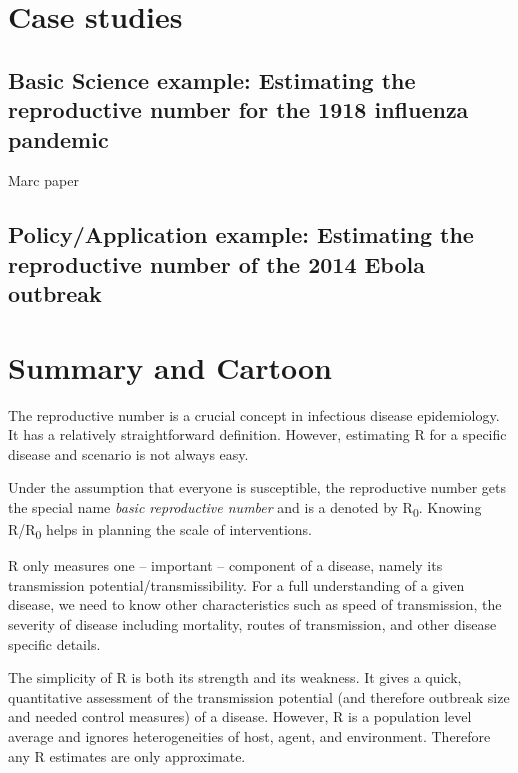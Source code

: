 \documentclass[
]{book}
\begin{document}
\hypertarget{case-studies}{%
\section{Case studies}\label{case-studies}}

\hypertarget{basic-science-example-estimating-the-reproductive-number-for-the-1918-influenza-pandemic}{%
\subsection{Basic Science example: Estimating the reproductive number for the 1918 influenza pandemic}\label{basic-science-example-estimating-the-reproductive-number-for-the-1918-influenza-pandemic}}

Marc paper

\hypertarget{policyapplication-example-estimating-the-reproductive-number-of-the-2014-ebola-outbreak}{%
\subsection{Policy/Application example: Estimating the reproductive number of the 2014 Ebola outbreak}\label{policyapplication-example-estimating-the-reproductive-number-of-the-2014-ebola-outbreak}}

\hypertarget{summary-and-cartoon-3}{%
\section{Summary and Cartoon}\label{summary-and-cartoon-3}}

The reproductive number is a crucial concept in infectious disease epidemiology. It has a relatively straightforward definition. However, estimating R for a specific disease and scenario is not always easy.

Under the assumption that everyone is susceptible, the reproductive number gets the special name \emph{basic reproductive number} and is a denoted by R\textsubscript{0}. Knowing R/R\textsubscript{0} helps in planning the scale of interventions.

R only measures one -- important -- component of a disease, namely its transmission potential/transmissibility. For a full understanding of a given disease, we need to know other characteristics such as speed of transmission, the severity of disease including mortality, routes of transmission, and other disease specific details.

The simplicity of R is both its strength and its weakness. It gives a quick, quantitative assessment of the transmission potential (and therefore outbreak size and needed control measures) of a disease. However, R is a population level average and ignores heterogeneities of host, agent, and environment. Therefore any R estimates are only approximate.
\end{document}
